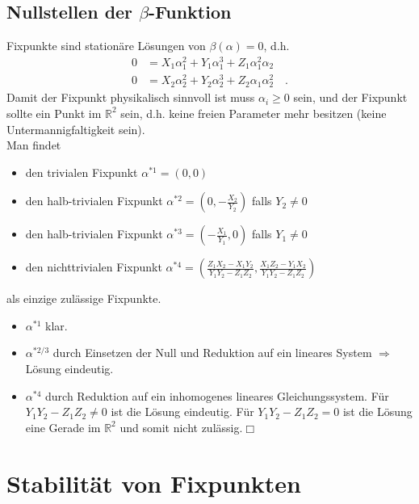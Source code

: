 \documentclass{article}
\newenvironment{proof}[1][Beweis]{\begin{trivlist}
\item[\hskip \labelsep {\bfseries #1}]}{\end{trivlist}}
\begin{document}
	
  \subsection{Nullstellen der $\beta$-Funktion}
	
	Fixpunkte sind stationäre Lösungen von $\beta(\alpha)=0$, d.h.
	\begin{align}
	 0&=X_1 \alpha_1^2 +Y_1 \alpha_1^3 +Z_1 \alpha_1^2 \alpha_2 \\
	 0&=X_2 \alpha_2^2 +Y_2 \alpha_2^3 +Z_2 \alpha_1 \alpha_2^2  \quad.	 
	\end{align}
	Damit der Fixpunkt physikalisch sinnvoll ist muss $\alpha_i\geq 0$ sein, und der Fixpunkt sollte ein Punkt 
	im $\mathbb{R}^2$ sein, d.h. keine freien Parameter mehr besitzen (keine Untermannigfaltigkeit sein).\\
	Man findet 
	\begin{itemize}
	 \item den trivialen Fixpunkt $\alpha^{*1}=(0,0)$
	 \item den halb-trivialen Fixpunkt $\alpha^{*2}=(0,-\frac{X_2}{Y_2})$ falls $Y_2\neq 0$
	 \item den halb-trivialen Fixpunkt $\alpha^{*3}=(-\frac{X_1}{Y_1},0)$ falls $Y_1\neq 0$
	 \item den nichttrivialen Fixpunkt $\alpha^{*4}=\left(\frac{Z_1X_2-X_1Y_2}{Y_1Y_2-Z_1Z_2},\frac{X_1Z_2-Y_1X_2}{Y_1Y_2-Z_1Z_2}\right)$
	\end{itemize}
	als einzige zulässige Fixpunkte.
	\begin{proof}
	 \begin{itemize}
	  \item $\alpha^{*1}$ klar.
	  \item $\alpha^{*2/3}$ durch Einsetzen der Null und Reduktion auf ein lineares System $\Rightarrow$ Lösung eindeutig.
	  \item $\alpha^{*4}$ durch Reduktion auf ein inhomogenes lineares Gleichungssystem. Für $Y_1Y_2-Z_1Z_2\neq 0$ ist die Lösung 
		eindeutig. Für $Y_1Y_2-Z_1Z_2 = 0$ ist die Lösung eine Gerade im $\mathbb{R}^2$ und somit nicht zulässig.$\Box$
	 \end{itemize}
	\end{proof}



	
	
\clearpage	
\section{Stabilität von Fixpunkten}
 
\end{document}
